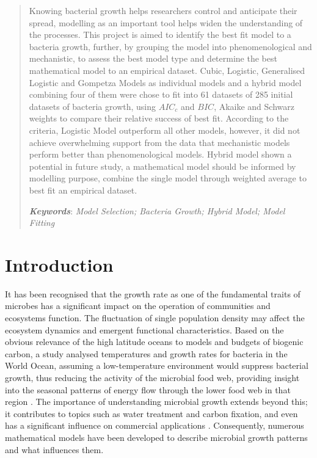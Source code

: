 \documentclass[a4paper]{report}
\begin{document}
\begin{linenumbers}
\renewcommand\thesection{\arabic{section}}
\newcommand{\keywords}[1]{\par\addvspace\baselineskip
\noindent\keywordname\enspace\ignorespaces#1}
\begin{abstract}
Knowing bacterial growth helps researchers control and anticipate their spread, modelling as an important tool helps widen the understanding of the processes. This project is aimed to identify the best fit model to a bacteria growth, further, by grouping the model into phenomenological and mechanistic, to assess the best model type and determine the best mathematical model to an empirical dataset. Cubic, Logistic, Generalised Logistic and Gompetza Models as individual models and a hybrid model combining four of them were chose to fit into 61 datasets of 285 initial datasets of bacteria growth, using $AIC_c$ and $BIC$, Akaike and Schwarz weights to compare their relative success of best fit. According to the criteria, Logistic Model outperform all other models, however, it did not achieve overwhelming support from the data that mechanistic models perform better than phenomenological models. Hybrid model shown a potential in future study, a mathematical model should be informed by modelling purpose, combine the single model through weighted average to best fit an empirical dataset. 

\textbf{\textit{Keywords}}: \textit{Model Selection; Bacteria Growth; Hybrid Model; Model Fitting}

\end{abstract}

    \section{Introduction}
    It has been recognised that the growth rate as one of the fundamental traits of microbes has a significant impact on the operation of communities and ecosystems function. The fluctuation of single population density may affect the ecosystem dynamics and emergent functional characteristics. Based on the obvious relevance of the high latitude oceans to models and budgets of biogenic carbon, a study analysed temperatures and growth rates for bacteria in the World Ocean, assuming a low-temperature environment would suppress bacterial growth, thus reducing the activity of the microbial food web, providing insight into the seasonal patterns of energy flow through the lower food web in that region \citep{rivkin1996microbial}. The importance of understanding microbial growth extends beyond this; it contributes to topics such as water treatment and carbon fixation, and even has a significant influence on commercial applications \citep{esser2015modeling}. Consequently, numerous mathematical models have been developed to describe microbial growth patterns and what influences them.


\end{linenumbers}
\end{document}
